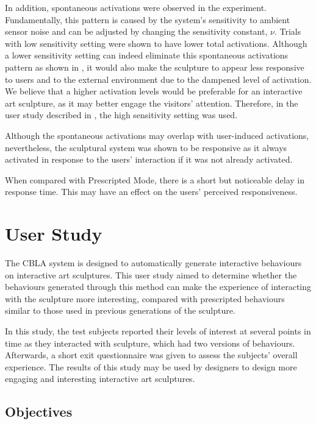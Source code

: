 In addition, spontaneous activations were observed in the experiment. Fundamentally, this pattern is caused by the system's sensitivity to ambient sensor noise and can be adjusted by changing the sensitivity constant, $\nu$. Trials with low sensitivity setting were shown to have lower total activations. Although a lower sensitivity setting can indeed eliminate this spontaneous activations pattern as shown in , it would also make the sculpture to appear less responsive to users and to the external environment due to the dampened level of activation. We believe that a higher activation levels would be preferable for an interactive art sculpture, as it may better engage the visitors' attention. Therefore, in the user study described in , the high sensitivity setting was used.

Although the spontaneous activations may overlap with user-induced activations, nevertheless, the sculptural system was shown to be responsive as it always activated in response to the users' interaction if it was not already activated.

When compared with Prescripted Mode, there is a short but noticeable delay in response time. This may have an effect on the users' perceived responsiveness.

\FloatBarrier
\section{User Study}\label{sec:user-study}

The CBLA system is designed to automatically generate interactive behaviours on interactive art sculptures. This user study aimed to determine whether the behaviours generated through this method can make the experience of interacting with the sculpture more interesting, compared with prescripted behaviours similar to those used in previous generations of the sculpture.

In this study, the test subjects reported their levels of interest at several points in time as they interacted with sculpture, which had two versions of behaviours. Afterwards, a short exit questionnaire was given to assess the subjects' overall experience. The results of this study may be used by designers to design more engaging and interesting interactive art sculptures. 

\subsection{Objectives}\label{sec:user-study-objectives}

